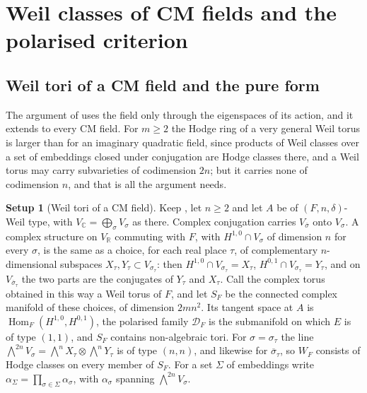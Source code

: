 \documentclass[11pt,reqno]{amsart}
\theoremstyle{plain}
\theoremstyle{definition}
\newtheorem{setupenv}[theorem]{Setup}
\theoremstyle{remark}
\newcommand{\RR}{\mathbb{R}}
\newcommand{\CC}{\mathbb{C}}
\newcommand{\cD}{\mathcal{D}}
\DeclareMathOperator{\Hom}{Hom}
\newcommand{\bbar}[1]{\overline{#1}}
\begin{document}
\section{Weil classes of CM fields and the polarised criterion}\label{sec:cmcriterion}

\subsection{Weil tori of a CM field and the pure form}
\label{ssec:cmweiltori}

The argument of  uses the field only through the
eigenspaces of its action, and it extends to every CM field. For $m\ge2$ the
Hodge ring of a very general Weil torus is larger than for an imaginary
quadratic field, since products of Weil classes over a set of embeddings
closed under conjugation are Hodge classes there, and a Weil torus may carry
subvarieties of codimension $2n$; but it carries none of codimension $n$, and
that is all the argument needs.

\begin{setupenv}[Weil tori of a CM field]\label{setup:cmweiltori}
Keep \cite[Setup~17.1]{paperI}, let $n\ge2$ and let $A$ be of $(F,n,\delta)$-Weil
type, with $V_{\CC}=\bigoplus_{\sigma}V_{\sigma}$ as there. Complex
conjugation carries $V_{\bbar\sigma}$ onto $V_{\sigma}$. A complex structure on
$V_{\RR}$ commuting with $F$, with $H^{1,0}\cap V_{\sigma}$ of dimension $n$
for every $\sigma$, is the same as a choice, for each real place $\tau$, of
complementary $n$-dimensional subspaces $X_{\tau},Y_{\tau}\subset
V_{\sigma_{\tau}}$: then $H^{1,0}\cap V_{\sigma_{\tau}}=X_{\tau}$,
$H^{0,1}\cap V_{\sigma_{\tau}}=Y_{\tau}$, and on $V_{\bbar\sigma_{\tau}}$ the
two parts are the conjugates of $Y_{\tau}$ and $X_{\tau}$. Call the complex
torus obtained in this way a Weil torus of $F$, and let $S_{F}$ be the
connected complex manifold of these choices, of dimension $2mn^{2}$. Its
tangent space at $A$ is $\Hom_{F}(H^{1,0},H^{0,1})$, the polarised family
$\cD_{F}$ is the submanifold on which $E$ is of type $(1,1)$, and $S_{F}$
contains non-algebraic tori. For $\sigma=\sigma_{\tau}$ the line
$\bigwedge^{2n}V_{\sigma}=\bigwedge^{n}X_{\tau}\otimes\bigwedge^{n}Y_{\tau}$ is
of type $(n,n)$, and likewise for $\bbar\sigma_{\tau}$, so $W_{F}$ consists
of Hodge classes on every member of $S_{F}$. For a set $\Sigma$ of
embeddings write $\alpha_{\Sigma}=\prod_{\sigma\in\Sigma}\alpha_{\sigma}$,
with $\alpha_{\sigma}$ spanning $\bigwedge^{2n}V_{\sigma}$.
\end{setupenv}
\end{document}
